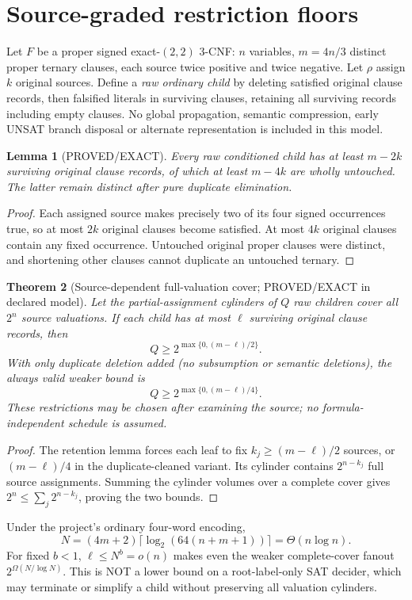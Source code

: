 \documentclass[11pt]{article}
\newtheorem{theorem}{Theorem}
\newtheorem{lemma}[theorem]{Lemma}
\begin{document}
\section{Source-graded restriction floors}
Let $F$ be a proper signed exact-$(2,2)$ 3-CNF: $n$ variables, $m=4n/3$ distinct proper ternary clauses, each source twice positive and twice negative. Let $\rho$ assign $k$ original sources. Define a \emph{raw ordinary child} by deleting satisfied original clause records, then falsified literals in surviving clauses, retaining all surviving records including empty clauses. No global propagation, semantic compression, early UNSAT branch disposal or alternate representation is included in this model.
\begin{lemma}[PROVED/EXACT]
Every raw conditioned child has at least $m-2k$ surviving original clause records, of which at least $m-4k$ are wholly untouched. The latter remain distinct after pure duplicate elimination.
\end{lemma}
\begin{proof}
Each assigned source makes precisely two of its four signed occurrences true, so at most $2k$ original clauses become satisfied. At most $4k$ original clauses contain any fixed occurrence. Untouched original proper clauses were distinct, and shortening other clauses cannot duplicate an untouched ternary.
\end{proof}
\begin{theorem}[Source-dependent full-valuation cover; PROVED/EXACT in declared model]
Let the partial-assignment cylinders of $Q$ raw children cover \emph{all} $2^n$ source valuations. If each child has at most $\ell$ surviving original clause records, then
\[
 Q\ge 2^{\max\{0,(m-\ell)/2\}}.
\]
With only duplicate deletion added (no subsumption or semantic deletions), the always valid weaker bound is
\[
 Q\ge 2^{\max\{0,(m-\ell)/4\}}.
\]
These restrictions may be chosen after examining the source; no formula-independent schedule is assumed.
\end{theorem}
\begin{proof}
The retention lemma forces each leaf to fix $k_j\ge(m-\ell)/2$ sources, or $(m-\ell)/4$ in the duplicate-cleaned variant. Its cylinder contains $2^{n-k_j}$ full source assignments. Summing the cylinder volumes over a complete cover gives $2^n\le\sum_j2^{n-k_j}$, proving the two bounds.
\end{proof}
Under the project's ordinary four-word encoding,
\[
N=(4m+2)\lceil\log_2(64(n+m+1))\rceil=\Theta(n\log n).
\]
For fixed $b<1$, $\ell\le N^b=o(n)$ makes even the weaker complete-cover fanout $2^{\Omega(N/\log N)}$. This is NOT a lower bound on a root-label-only SAT decider, which may terminate or simplify a child without preserving all valuation cylinders.
\end{document}
